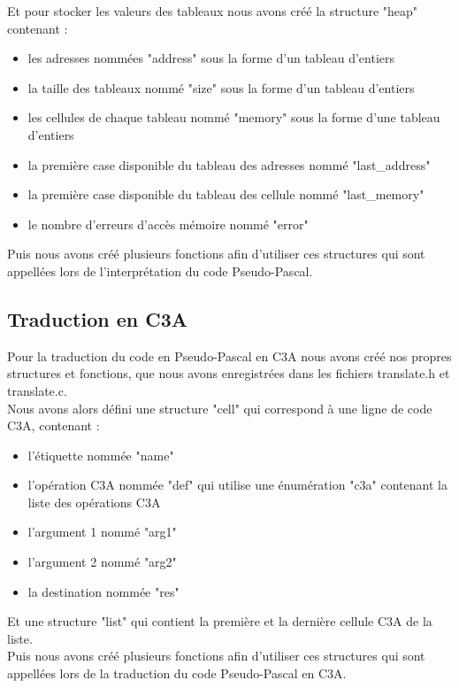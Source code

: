\documentclass{report}
\begin{document}
Et pour stocker les valeurs des tableaux nous avons créé la structure "heap" contenant :
\begin{itemize}
\item les adresses nommées "address" sous la forme d'un tableau d'entiers
\item la taille des tableaux nommé "size" sous la forme d'un tableau d'entiers
\item les cellules de chaque tableau nommé "memory" sous la forme d'une tableau d'entiers
\item la première case disponible du tableau des adresses nommé "last\_address"
\item la première case disponible du tableau des cellule nommé "last\_memory"
\item le nombre d'erreurs d'accès mémoire nommé "error"
\end{itemize}
\bigskip

Puis nous avons créé plusieurs fonctions afin d'utiliser ces structures qui sont appellées lors de l'interprétation du code Pseudo-Pascal.

\subsection{Traduction en C3A}
Pour la traduction du code en Pseudo-Pascal en C3A nous avons créé nos propres structures et fonctions, que nous avons enregistrées dans les fichiers translate.h et translate.c.\\

Nous avons alors défini une structure "cell" qui correspond à une ligne de code C3A, contenant :
\begin{itemize}
\item l'étiquette nommée "name"
\item l'opération C3A nommée "def" qui utilise une énumération "c3a" contenant la liste des opérations C3A
\item l'argument 1 nommé "arg1"
\item l'argument 2 nommé "arg2"
\item la destination nommée "res"
\end{itemize}
\bigskip

Et une structure "list" qui contient la première et la dernière cellule C3A de la liste.\\

Puis nous avons créé plusieurs fonctions afin d'utiliser ces structures qui sont appellées lors de la traduction du code Pseudo-Pascal en C3A.\\
\end{document}

